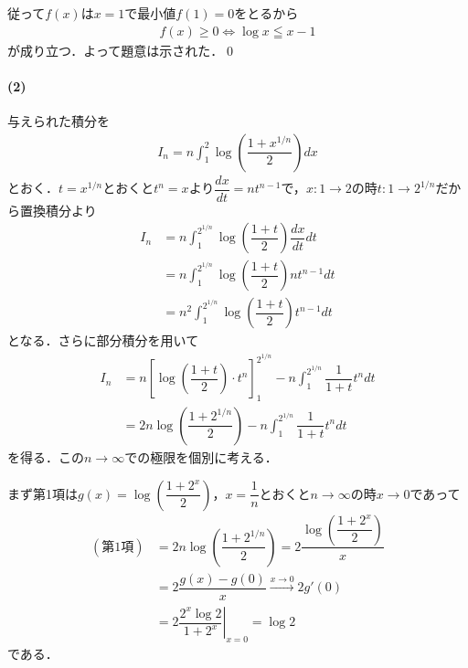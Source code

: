\documentclass[../../main.tex]{subfiles}
\begin{document}
従って$f(x)$は$x=1$で最小値$f(1)=0$をとるから
\begin{align}
  f(x) \ge 0 \iff \log x\leqq x-1
\end{align}
が成り立つ．よって題意は示された．\qed

\paragraph{(2)}

与えられた積分を
\begin{align}
  I_n = n\int_{1}^{2}\log\left(\dfrac{1+x^{1/n}}{2}\right)dx \label{eq:2}
\end{align}
とおく．$t=x^{1/n}$とおくと$t^n=x$より$\dfrac{dx}{dt}=nt^{n-1}$で，$x:1\to2$の時$t:1\to 2^{1/n}$だから置換積分より
\begin{align}
  I_n
  & = n\int_{1}^{2^{1/n}}\log \left(\dfrac{1+t}{2}\right) \dfrac{dx}{dt} dt \\
  & = n\int_{1}^{2^{1/n}}\log \left(\dfrac{1+t}{2}\right) nt^{n-1} dt  \\
  & = n^2\int_{1}^{2^{1/n}}\log \left(\dfrac{1+t}{2}\right) t^{n-1} dt
\end{align}
となる．さらに部分積分を用いて
\begin{align}
  I_n
  & = n\left[\log \left(\dfrac{1+t}{2}\right) \cdot t^n \right]_{1}^{2^{1/n}}
  - n\int_{1}^{2^{1/n}} \dfrac{1}{1+t}t^n dt \\
  & = 2n \log \left(\dfrac{1+2^{1/n}}{2}\right)
  - n\int_{1}^{2^{1/n}} \dfrac{1}{1+t}t^n dt \label{eq:3}
\end{align}
を得る．この$n\to\infty$での極限を個別に考える．

まず第1項は$g(x)=\log\left(\dfrac{1+2^x}{2}\right)$，$x=\dfrac{1}{n}$とおくと$n\to\infty$の時$x\to 0$であって
\begin{align}
  (\text{第1項})
  &= 2n \log \left(\dfrac{1+2^{1/n}}{2}\right)
  = 2\dfrac{\log\left(\dfrac{1+2^x}{2}\right)}{x} \\
  &= 2\dfrac{g(x)-g(0)}{x}
  \xrightarrow{x\to 0} 2g'(0) \\
  &= \left. 2\dfrac{2^x \log 2 }{1+2^x}\right|_{x=0}
  = \log 2 \label{eq:4}
\end{align}
である．
\end{document}
